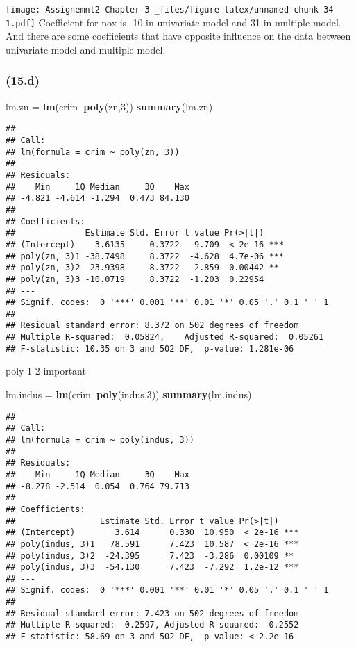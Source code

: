 \documentclass[]{article}
\newenvironment{Shaded}{\begin{snugshade}}{\end{snugshade}}
\newcommand{\DecValTok}[1]{\textcolor[rgb]{0.00,0.00,0.81}{#1}}
\newcommand{\KeywordTok}[1]{\textcolor[rgb]{0.13,0.29,0.53}{\textbf{#1}}}
\newcommand{\NormalTok}[1]{#1}
\newcommand{\OperatorTok}[1]{\textcolor[rgb]{0.81,0.36,0.00}{\textbf{#1}}}
\newcommand{\StringTok}[1]{\textcolor[rgb]{0.31,0.60,0.02}{#1}}
\begin{document}
\texttt{[image: Assignemnt2-Chapter-3-\_files/figure-latex/unnamed-chunk-34-1.pdf]}
Coefficient for nox is -10 in univariate model and 31 in multiple model.
And there are some coefficients that have opposite influence on the data
between univariate model and multiple model.

\hypertarget{d-3}{%
\subsubsection{(15.d)}\label{d-3}}

\begin{Shaded}
\begin{Highlighting}[]
\NormalTok{lm.zn =}\StringTok{ }\KeywordTok{lm}\NormalTok{(crim}\OperatorTok{~}\KeywordTok{poly}\NormalTok{(zn,}\DecValTok{3}\NormalTok{))}
\KeywordTok{summary}\NormalTok{(lm.zn)}
\end{Highlighting}
\end{Shaded}

\begin{verbatim}
## 
## Call:
## lm(formula = crim ~ poly(zn, 3))
## 
## Residuals:
##    Min     1Q Median     3Q    Max 
## -4.821 -4.614 -1.294  0.473 84.130 
## 
## Coefficients:
##              Estimate Std. Error t value Pr(>|t|)    
## (Intercept)    3.6135     0.3722   9.709  < 2e-16 ***
## poly(zn, 3)1 -38.7498     8.3722  -4.628  4.7e-06 ***
## poly(zn, 3)2  23.9398     8.3722   2.859  0.00442 ** 
## poly(zn, 3)3 -10.0719     8.3722  -1.203  0.22954    
## ---
## Signif. codes:  0 '***' 0.001 '**' 0.01 '*' 0.05 '.' 0.1 ' ' 1
## 
## Residual standard error: 8.372 on 502 degrees of freedom
## Multiple R-squared:  0.05824,    Adjusted R-squared:  0.05261 
## F-statistic: 10.35 on 3 and 502 DF,  p-value: 1.281e-06
\end{verbatim}

poly 1 2 important

\begin{Shaded}
\begin{Highlighting}[]
\NormalTok{lm.indus =}\StringTok{ }\KeywordTok{lm}\NormalTok{(crim}\OperatorTok{~}\KeywordTok{poly}\NormalTok{(indus,}\DecValTok{3}\NormalTok{))}
\KeywordTok{summary}\NormalTok{(lm.indus)}
\end{Highlighting}
\end{Shaded}

\begin{verbatim}
## 
## Call:
## lm(formula = crim ~ poly(indus, 3))
## 
## Residuals:
##    Min     1Q Median     3Q    Max 
## -8.278 -2.514  0.054  0.764 79.713 
## 
## Coefficients:
##                 Estimate Std. Error t value Pr(>|t|)    
## (Intercept)        3.614      0.330  10.950  < 2e-16 ***
## poly(indus, 3)1   78.591      7.423  10.587  < 2e-16 ***
## poly(indus, 3)2  -24.395      7.423  -3.286  0.00109 ** 
## poly(indus, 3)3  -54.130      7.423  -7.292  1.2e-12 ***
## ---
## Signif. codes:  0 '***' 0.001 '**' 0.01 '*' 0.05 '.' 0.1 ' ' 1
## 
## Residual standard error: 7.423 on 502 degrees of freedom
## Multiple R-squared:  0.2597, Adjusted R-squared:  0.2552 
## F-statistic: 58.69 on 3 and 502 DF,  p-value: < 2.2e-16
\end{verbatim}
\end{document}
